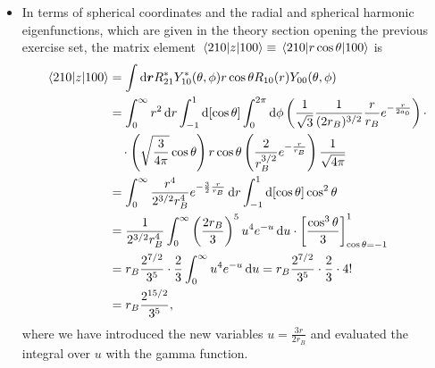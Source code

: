 \documentclass[11pt, a4paper]{article}
\newcommand{\diff}{\mathop{}\!\mathrm{d}} %
\renewcommand{\vec}[1]{\bm{#1}} %
\renewcommand{\r}{\vec{r}}  %
\begin{document}
\begin{itemize}
	\item In terms of spherical coordinates and the radial and spherical harmonic eigenfunctions, which are given in the theory section opening the previous exercise set, the matrix element $ \mel{210}{z}{100} \equiv \mel{210}{r\cos \theta}{100} $ is
	\begin{align*}
		\mel{210}{z}{100} &= \int \diff \r R_{21}^{*}Y_{10}^{*}(\theta, \phi) r \cos \theta R_{10}(r)Y_{00}(\theta, \phi)\\
		& = \int_{0}^{\infty}r^{2}\diff r \int_{-1}^{1}\diff [\cos \theta] \int_{0}^{2\pi} \diff \phi \left(\frac{1}{\sqrt{3}}\frac{1}{(2r_{B})^{3/2}}\frac{r}{r_{B}}e^{-\frac{r}{2a_{0}}}\right)\cdot\\
		&{} \quad \cdot \left(\sqrt{\frac{3}{4\pi}}\cos \theta\right) r\cos \theta \left(\frac{2}{r_{B}^{3/2}}e^{-\frac{r}{r_{B}}}\right)\frac{1}{\sqrt{4\pi}}\\
		& = \int_{0}^{\infty}\frac{r^{4}}{2^{3/2}r_{B}^{4}}e^{-\frac{3}{2}\frac{r}{r_{B}}}\diff r\int_{-1}^{1}\diff [\cos \theta] \cos^{2}\theta\\
		& = \frac{1}{2^{3/2}r_{B}^{4}} \int_{0}^{\infty} \left(\frac{2r_{B}}{3}\right)^{5} u^{4}e^{-u}\diff u \cdot \left[\frac{\cos^{3}\theta}{3}\right]_{\cos \theta = -1}^{1}\\
		& = r_{B}\frac{2^{7/2}}{3^{5}}\cdot \frac{2}{3} \int_{0}^{\infty}u^{4}e^{-u}\diff u = r_{B}\frac{2^{7/2}}{3^{5}} \cdot \frac{2}{3} \cdot 4!\\
		& = r_{B}\frac{2^{15/2}}{3^{5}},
	\end{align*}
	where we have introduced the new variables $ u = \frac{3r}{2r_{B}} $ and evaluated the integral over $ u $ with the gamma function.


\end{itemize}
\end{document}
